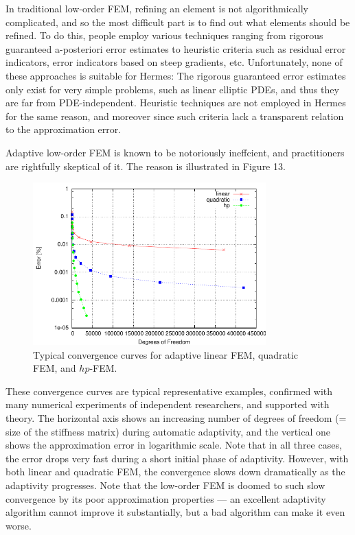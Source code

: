 \documentclass[11pt]{article}
\begin{document}
In traditional low-order FEM, refining an element is not algorithmically complicated,
and so the most difficult part is to find out what elements should be
refined. To do this, people employ various techniques ranging from rigorous
guaranteed a-posteriori error estimates to heuristic criteria such as residual
error indicators, error indicators based on steep gradients, etc. Unfortunately,
none of these approaches is suitable for Hermes: The rigorous guaranteed error
estimates only exist for very simple problems, such as linear elliptic PDEs,
and thus they are far from PDE-independent. Heuristic techniques are not
employed in Hermes for the same reason, and moreover since such criteria
lack a transparent relation to the approximation error.

Adaptive low-order FEM is known to be notoriously ineffcient, and practitioners
are rightfully skeptical of it. The reason is illustrated in Figure 13.

\begin{figure}[!ht]
  \medskip \centering
  \includegraphics[width=0.8\textwidth]{img/conv_new}
  \caption{Typical convergence curves for adaptive linear FEM, quadratic
FEM, and $hp$-FEM.}
  \label{fig:conv}
\end{figure}

These convergence curves are typical representative examples, confirmed with
many numerical experiments of independent researchers, and supported with
theory. The horizontal axis shows an increasing number of degrees of freedom
(= size of the stiffness matrix) during automatic adaptivity, and the vertical
one shows the approximation error in logarithmic scale. Note that in all
three cases, the error drops very fast during a short initial phase of adaptivity.
However, with both linear and quadratic FEM, the convergence slows
down dramatically as the adaptivity progresses. Note that the low-order FEM
is doomed to such slow convergence by its poor approximation properties ---
an excellent adaptivity algorithm cannot improve it substantially, but a bad
algorithm can make it even worse.
\end{document}
